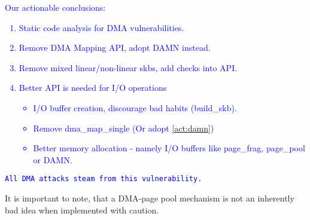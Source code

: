 \textcolor{blue}{
Our actionable conclusions:
\begin{enumerate}
    \item Static code analysis for DMA vulnerabilities.
    \item Remove DMA Mapping API, adopt DAMN instead. \label{act:damn}
    \item Remove mixed linear/non-linear skbs, add checks into \shinfo API.
    \item Better API is needed for I/O operations
    \begin{itemize}
        \item I/O buffer creation, discourage bad habits (build\_skb).
        \item Remove dma\_map\_single (Or adopt \ref{act:damn})
        \item Better memory allocation - namely I/O buffers like page\_frag, page\_pool or DAMN.
    \end{itemize}
\end{enumerate}
\texttt{All DMA attacks steam from this vulnerability.}
}

It is important to note, that a DMA-page pool mechanism is not an inherently bad idea when implemented with caution\cite{MSMT18}. 
